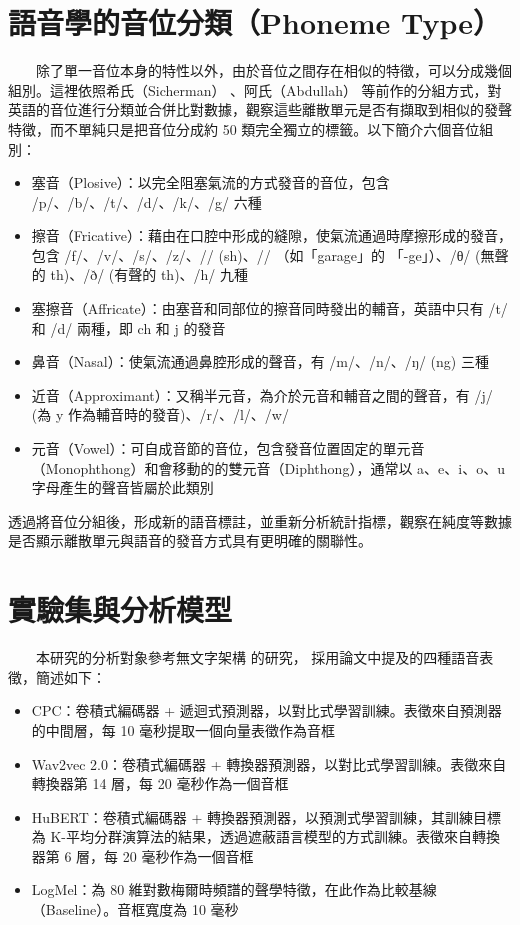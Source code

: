 {\section{語音學的音位分類（Phoneme Type）}

　　除了單一音位本身的特性以外，由於音位之間存在相似的特徵，可以分成幾個組別。這裡依照希氏（Sicherman） \cite{10097097}、阿氏（Abdullah）\cite{abdullah23_interspeech} 等前作的分組方式，對英語的音位進行分類並合併比對數據，觀察這些離散單元是否有擷取到相似的發聲特徵，而不單純只是把音位分成約 50 類完全獨立的標籤。以下簡介六個音位組別：
        
        \begin{itemize}
            \item 塞音（Plosive）：以完全阻塞氣流的方式發音的音位，包含 /p/、/b/、/t/、/d/、/k/、/g/ 六種
            \item 擦音（Fricative）：藉由在口腔中形成的縫隙，使氣流通過時摩擦形成的發音，包含 /f/、/v/、/s/、/z/、/\textesh/ (sh)、/\textyogh/ （如「garage」的 「-ge」）、/θ/ (無聲的 th)、/ð/ (有聲的 th)、/h/ 九種
            \item 塞擦音（Affricate）：由塞音和同部位的擦音同時發出的輔音，英語中只有 /t\textesh/ 和 /d\textyogh/ 兩種，即 ch 和 j 的發音
            \item 鼻音（Nasal）：使氣流通過鼻腔形成的聲音，有 /m/、/n/、/ŋ/ (ng) 三種
            \item 近音（Approximant）：又稱半元音，為介於元音和輔音之間的聲音，有 /j/ (為 y 作為輔音時的發音)、/r/、/l/、/w/
            \item 元音（Vowel）：可自成音節的音位，包含發音位置固定的單元音（Monophthong）和會移動的的雙元音（Diphthong），通常以 a、e、i、o、u 字母產生的聲音皆屬於此類別
        \end{itemize}
        
        透過將音位分組後，形成新的語音標註，並重新分析統計指標，觀察在純度等數據是否顯示離散單元與語音的發音方式具有更明確的關聯性。


\section{實驗集與分析模型}

　　本研究的分析對象參考無文字架構 \cite{noauthor_textless_2021, lakhotia_generative_2021, lakhotia_generative_2021-1} 的研究，
採用論文中提及的四種語音表徵，簡述如下：

\begin{itemize}
    \item CPC：卷積式編碼器 + 遞迴式預測器，以對比式學習訓練。表徵來自預測器的中間層，每 10 毫秒提取一個向量表徵作為音框
    \item Wav2vec 2.0：卷積式編碼器 + 轉換器預測器，以對比式學習訓練。表徵來自轉換器第 14 層，每 20 毫秒作為一個音框
    \item HuBERT：卷積式編碼器 + 轉換器預測器，以預測式學習訓練，其訓練目標為 K-平均分群演算法的結果，透過遮蔽語言模型的方式訓練。表徵來自轉換器第 6 層，每 20 毫秒作為一個音框
    \item LogMel：為 80 維對數梅爾時頻譜的聲學特徵，在此作為比較基線（Baseline）。音框寬度為 10 毫秒
\end{itemize}

}

